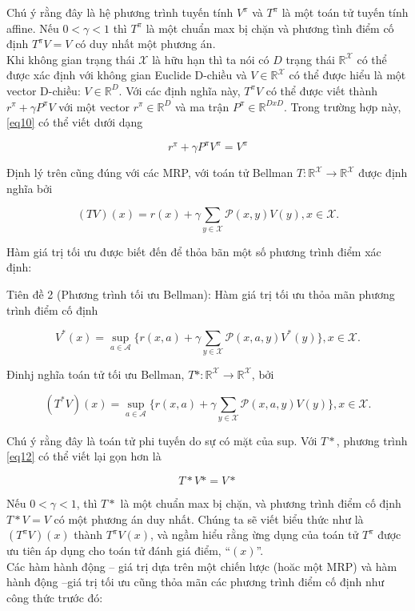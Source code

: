 \documentclass[14pt,a4paper,oneside]{report}		%
\begin{document}
Chú ý rằng đây là hệ phương trình tuyến tính $V^\pi$ và $T^\pi$ là một toán tử tuyến tính affine. Nếu $0<\gamma<1$ thì $T^\pi$ là một chuẩn max bị chặn và phương tình điểm cố định $T^\pi V = V$ có duy nhất một phương án.\\
Khi không gian trạng thái $\mathcal{X}$ là hữu hạn thì ta nói có $D$ trạng thái $\mathbb{R}^\mathcal{X}$ có thể được xác định với không gian Euclide D-chiều và $V\in\mathbb{R}^\mathcal{X}$ có thể được hiểu là một vector D-chiều: $V\in\mathbb{R}^D$. Với các định nghĩa này, $T^\pi V$ có thể được viết thành $r^\pi+\gamma P^\pi V$ với một vector $r^\pi\in\mathbb{R}^D$ và ma trận $P^\pi\in\mathbb{R}^{DxD}$. Trong trường hợp này, \ref{eq10} có thể viết dưới dạng


\begin{equation} \label{eq11}
r^\pi+\gamma P^\pi V^\pi=V^\pi
\end{equation}

Định lý trên cũng đúng với các MRP, với toán tử Bellman $T:\mathbb{R}^\mathcal{X}\rightarrow\mathbb{R}^\mathcal{X}$ được định nghĩa bởi

$$(TV)(x) = r(x) + \gamma \displaystyle\sum_{y\in\mathcal{X}}{\mathcal{P}(x,y)V(y)}, x\in\mathcal{X}.$$

Hàm giá trị tối ưu được biết đến để thỏa bãn một số phương trình điểm xác định:

Tiên đề 2 (Phương trình tối ưu Bellman): Hàm giá trị tối ưu thỏa mãn phương trình điểm cố định

\begin{equation} \label{eq12}
V^*(x)=\sup_{a\in\mathcal{A}}\bigg\{ r(x,a) + \gamma \displaystyle\sum_{y\in\mathcal{X}}{\mathcal{P}(x,a,y)V^*(y)}\bigg\} , x\in\mathcal{X}.
\end{equation}

Đinhj nghĩa toán tử tối ưu Bellman, $T*:\mathbb{R}^\mathcal{X}\rightarrow\mathbb{R}^\mathcal{X}$, bởi

\begin{equation} \label{eq13}
(T^*V)(x)=\sup_{a\in\mathcal{A}}\bigg\{ r(x,a) + \gamma \displaystyle\sum_{y\in\mathcal{X}}{\mathcal{P}(x,a,y)V(y)}\bigg\} , x\in\mathcal{X}.
\end{equation}

Chú ý rằng đây là toán tử phi tuyến do sự có mặt của sup. Với $T*$, phương trình \ref{eq12} có thể viết lại gọn hơn là 

$$T*V*=V*$$

Nếu $0<\gamma<1$, thì $T*$ là một chuẩn max bị chặn, và phương trình điểm cố định $T*V=V$ có một phương án duy nhất.
Chúng ta sẽ viết biểu thức như là $(T^\pi V)(x)$ thành $T^\pi V(x)$, và ngầm hiểu rằng ừng dụng của toán tử $T^\pi$ được ưu tiên áp dụng cho toán tử đánh giá điểm, “$(x)$”.\\
Các hàm hành động – giá trị dựa trên một chiến lược (hoăc một MRP) và hàm hành động –giá trị tối ưu cũng thỏa mãn các phương trình điểm cố định như công thức trước đó:
\end{document}
